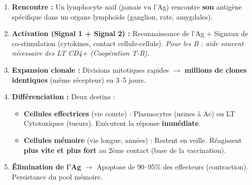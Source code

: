 \documentclass[11pt]{article}
\begin{document}
\begin{methode}
\begin{enumerate}
    \item \textbf{Rencontre :} Un lymphocyte naïf (jamais vu l'Ag) rencontre \textbf{son} antigène spécifique dans un organe lymphoïde (ganglion, rate, amygdales).
    \item \textbf{Activation (Signal 1 + Signal 2) :} Reconnaissance de l'Ag + Signaux de co-stimulation (cytokines, contact cellule-cellule). \emph{Pour les B : aide souvent nécessaire des LT CD4+ (Coopération T-B).}
    \item \textbf{Expansion clonale :} Divisions mitotiques rapides $\to$ \textbf{millions de clones identiques} (même récepteur) en 3--5 jours.
    \item \textbf{Différenciation :} Deux destins :
    \begin{itemize}
        \item \textbf{Cellules effectrices} (vie courte) : Plasmocytes (usines à Ac) ou LT Cytotoxiques (tueurs). Exécutent la réponse \textbf{immédiate}.
        \item \textbf{Cellules mémoire} (vie longue, années) : Restent en veille. Réagissent \textbf{plus vite et plus fort} au 2ème contact (base de la vaccination).
    \end{itemize}
    \item \textbf{Élimination de l'Ag} $\to$ Apoptose de 90--95\% des effecteurs (contraction). Persistance du pool mémoire.
\end{enumerate}
\end{methode}
\end{document}
